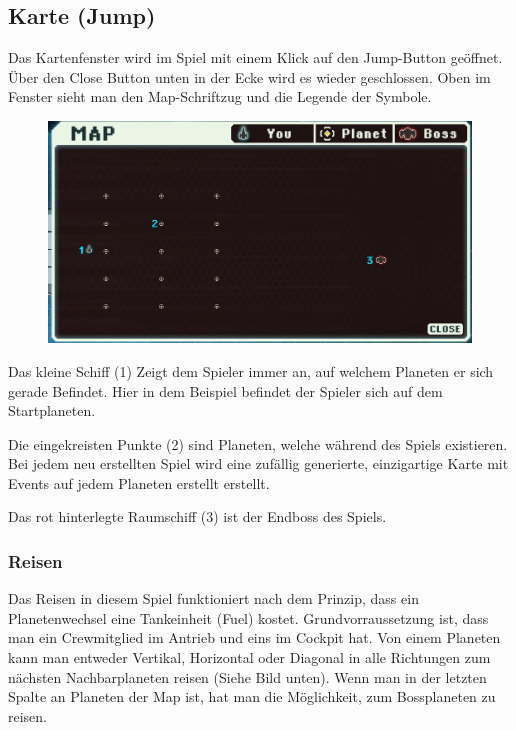 \documentclass[fontsize=12pt,paper=a4,twoside]{scrartcl}
\begin{document}

\subsection{Karte (Jump)}

Das Kartenfenster wird im Spiel mit einem Klick auf den Jump-Button geöffnet. Über den Close Button unten in der Ecke wird es wieder geschlossen. Oben im Fenster sieht man den Map-Schriftzug und die Legende der Symbole.

\begin{figure}[H]
\centering
\includegraphics[width=0.8\linewidth]{dasspiel/karte/karteuebersicht.png}
\end{figure} 


Das kleine Schiff (1) Zeigt dem Spieler immer an, auf welchem Planeten er sich gerade Befindet. Hier in dem Beispiel befindet der Spieler sich auf dem Startplaneten. 

Die eingekreisten Punkte (2) sind Planeten, welche während des Spiels existieren. Bei jedem neu erstellten Spiel wird eine zufällig generierte, einzigartige Karte mit Events auf jedem Planeten erstellt erstellt. 

Das rot hinterlegte Raumschiff (3) ist der Endboss des Spiels. 

\subsubsection{Reisen} 

Das Reisen in diesem Spiel funktioniert nach dem Prinzip, dass ein Planetenwechsel eine Tankeinheit (Fuel) kostet. Grundvorraussetzung ist, dass man ein Crewmitglied im Antrieb und eins im Cockpit hat. Von einem Planeten kann man entweder Vertikal, Horizontal oder Diagonal in alle Richtungen zum nächsten Nachbarplaneten reisen (Siehe Bild unten). Wenn man in der letzten Spalte an Planeten der Map ist, hat man die Möglichkeit, zum Bossplaneten zu reisen.
\end{document}
